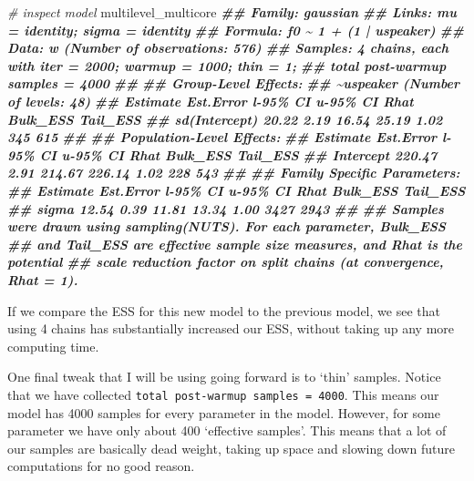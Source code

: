 \documentclass[
]{book}
\newenvironment{Shaded}{\begin{snugshade}}{\end{snugshade}}
\newcommand{\CommentTok}[1]{\textcolor[rgb]{0.56,0.35,0.01}{\textit{#1}}}
\newcommand{\DocumentationTok}[1]{\textcolor[rgb]{0.56,0.35,0.01}{\textbf{\textit{#1}}}}
\newcommand{\NormalTok}[1]{#1}
\begin{document}
\begin{Shaded}
\begin{Highlighting}[]
\CommentTok{\# inspect model}
\NormalTok{multilevel\_multicore}
\DocumentationTok{\#\#  Family: gaussian }
\DocumentationTok{\#\#   Links: mu = identity; sigma = identity }
\DocumentationTok{\#\# Formula: f0 \textasciitilde{} 1 + (1 | uspeaker) }
\DocumentationTok{\#\#    Data: w (Number of observations: 576) }
\DocumentationTok{\#\# Samples: 4 chains, each with iter = 2000; warmup = 1000; thin = 1;}
\DocumentationTok{\#\#          total post{-}warmup samples = 4000}
\DocumentationTok{\#\# }
\DocumentationTok{\#\# Group{-}Level Effects: }
\DocumentationTok{\#\# \textasciitilde{}uspeaker (Number of levels: 48) }
\DocumentationTok{\#\#               Estimate Est.Error l{-}95\% CI u{-}95\% CI Rhat Bulk\_ESS Tail\_ESS}
\DocumentationTok{\#\# sd(Intercept)    20.22      2.19    16.54    25.19 1.02      345      615}
\DocumentationTok{\#\# }
\DocumentationTok{\#\# Population{-}Level Effects: }
\DocumentationTok{\#\#           Estimate Est.Error l{-}95\% CI u{-}95\% CI Rhat Bulk\_ESS Tail\_ESS}
\DocumentationTok{\#\# Intercept   220.47      2.91   214.67   226.14 1.02      228      543}
\DocumentationTok{\#\# }
\DocumentationTok{\#\# Family Specific Parameters: }
\DocumentationTok{\#\#       Estimate Est.Error l{-}95\% CI u{-}95\% CI Rhat Bulk\_ESS Tail\_ESS}
\DocumentationTok{\#\# sigma    12.54      0.39    11.81    13.34 1.00     3427     2943}
\DocumentationTok{\#\# }
\DocumentationTok{\#\# Samples were drawn using sampling(NUTS). For each parameter, Bulk\_ESS}
\DocumentationTok{\#\# and Tail\_ESS are effective sample size measures, and Rhat is the potential}
\DocumentationTok{\#\# scale reduction factor on split chains (at convergence, Rhat = 1).}
\end{Highlighting}
\end{Shaded}

If we compare the ESS for this new model to the previous model, we see that using 4 chains has substantially increased our ESS, without taking up any more computing time.

One final tweak that I will be using going forward is to `thin' samples. Notice that we have collected \texttt{total\ post-warmup\ samples\ =\ 4000}. This means our model has 4000 samples for every parameter in the model. However, for some parameter we have only about 400 `effective samples'. This means that a lot of our samples are basically dead weight, taking up space and slowing down future computations for no good reason.
\end{document}
